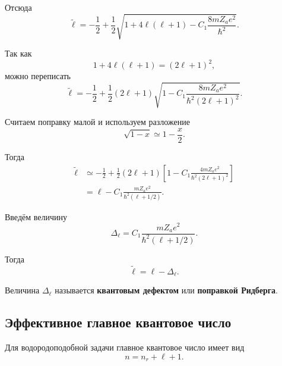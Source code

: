 \documentclass[../final.tex]{subfiles}
\begin{document}
Отсюда
\begin{equation*}
    \tilde\ell
    =
    -\frac12
    +
    \frac12
    \sqrt{
        1+4\ell(\ell+1)
        -
        C_1\frac{8mZ_a e^2}{\hbar^2}
    }.
\end{equation*}

Так как
\begin{equation*}
    1+4\ell(\ell+1)
    =
    (2\ell+1)^2,
\end{equation*}
можно переписать
\begin{equation*}
    \tilde\ell
    =
    -\frac12
    +
    \frac12(2\ell+1)
    \sqrt{
        1
        -
        C_1
        \frac{8mZ_a e^2}
        {\hbar^2(2\ell+1)^2}
    }.
\end{equation*}

Считаем поправку малой и используем разложение
\begin{equation*}
    \sqrt{1-x}
    \simeq
    1-\frac{x}{2}.
\end{equation*}

Тогда
\begin{align*}
    \tilde\ell
    &\simeq
    -\frac12
    +
    \frac12(2\ell+1)
    \left[
        1
        -
        C_1
        \frac{4mZ_a e^2}
        {\hbar^2(2\ell+1)^2}
    \right]
    \\
    &=
    \ell
    -
    C_1
    \frac{mZ_a e^2}
    {\hbar^2(\ell+1/2)}.
\end{align*}

Введём величину
\begin{equation*}
    \boxed{
        \Delta_\ell
        =
        C_1
        \frac{mZ_a e^2}
        {\hbar^2(\ell+1/2)}
    }.
\end{equation*}

Тогда
\begin{equation*}
    \boxed{
        \tilde\ell
        =
        \ell-\Delta_\ell
    }.
\end{equation*}

Величина \(\Delta_\ell\) называется \textbf{квантовым дефектом}
или \textbf{поправкой Ридберга}.

\subsection{Эффективное главное квантовое число}

Для водородоподобной задачи главное квантовое число имеет вид
\begin{equation*}
    n=n_r+\ell+1.
\end{equation*}
\end{document}

